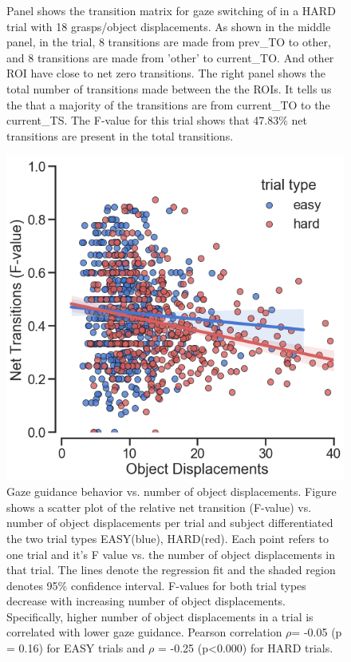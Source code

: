 \begin{figure}[h]
{    Panel \protect{} shows the transition matrix for gaze switching of in a HARD trial with 18 grasps/object displacements. As shown in the middle panel, in the trial, 8 transitions are made from prev\_TO to other, and 8 transitions are made from 'other' to current\_TO. And other ROI have close to net zero transitions. The right panel shows the total number of transitions made between the the ROIs. It tells us the that a majority of the transitions are from current\_TO to the current\_TS. The F-value for this trial shows that 47.83\%  net transitions are present in the total transitions.}
    \label{figure:transition_matrices_exe}
\end{figure}

\begin{figure}[h]
    \centering
    \includegraphics[width=0.3\linewidth]{source/figures/results/gaze_guidance_v_grasps_execution.png}
    \caption[]{Gaze guidance behavior vs. number of object displacements. Figure shows a scatter plot of the relative net transition (F-value) vs. number of object displacements per trial and subject differentiated the two trial types EASY(blue), HARD(red). Each point refers to one trial and it's F value vs. the number of object displacements in that trial. The lines denote the regression fit and the shaded region denotes 95\% confidence interval. F-values for both trial types decrease with increasing number of object displacements. Specifically, higher number of object displacements in a trial is correlated with lower gaze guidance. Pearson correlation $\rho$= -0.05 (p = 0.16) for EASY trials and $\rho$ = -0.25 (p<0.000) for HARD trials.}
    \label{figure:F_value_exe}
\end{figure}

